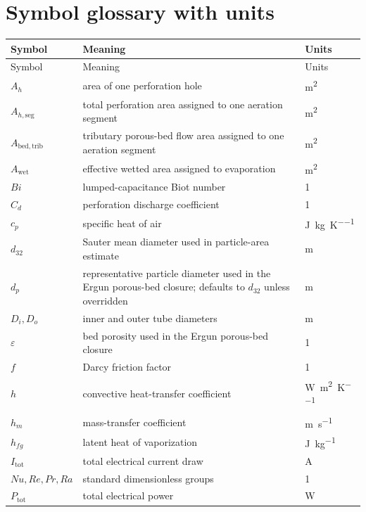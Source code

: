 \documentclass[11pt]{article}
\begin{document}
\section{Symbol glossary with units}
\begingroup
\small
\begin{longtable}{@{}L{0.16\textwidth}L{0.60\textwidth}L{0.14\textwidth}@{}}
\toprule
Symbol & Meaning & Units \\
\midrule
\endfirsthead
\toprule
Symbol & Meaning & Units \\
\midrule
\endhead
\(A_h\) & area of one perforation hole & \si{\meter\squared} \\
\(A_{h,\mathrm{seg}}\) & total perforation area assigned to one aeration segment & \si{\meter\squared} \\
\(A_{\mathrm{bed,trib}}\) & tributary porous-bed flow area assigned to one aeration segment & \si{\meter\squared} \\
\(A_{\mathrm{wet}}\) & effective wetted area assigned to evaporation & \si{\meter\squared} \\
\(Bi\) & lumped-capacitance Biot number & 1 \\
\(C_d\) & perforation discharge coefficient & 1 \\
\(c_p\) & specific heat of air & \si{\joule\per\kilogram\per\kelvin} \\
\(d_{32}\) & Sauter mean diameter used in particle-area estimate & \si{\meter} \\
\(d_p\) & representative particle diameter used in the Ergun porous-bed closure; defaults to \(d_{32}\) unless overridden & \si{\meter} \\
\(D_i,D_o\) & inner and outer tube diameters & \si{\meter} \\
\(\varepsilon\) & bed porosity used in the Ergun porous-bed closure & 1 \\
\(f\) & Darcy friction factor & 1 \\
\(h\) & convective heat-transfer coefficient & \si{\watt\per\meter\squared\per\kelvin} \\
\(h_m\) & mass-transfer coefficient & \si{\meter\per\second} \\
\(h_{fg}\) & latent heat of vaporization & \si{\joule\per\kilogram} \\
\(I_{\mathrm{tot}}\) & total electrical current draw & \si{\ampere} \\
\(Nu,Re,Pr,Ra\) & standard dimensionless groups & 1 \\
\(P_{\mathrm{tot}}\) & total electrical power & \si{\watt} \\

\end{longtable}
\end{document}
